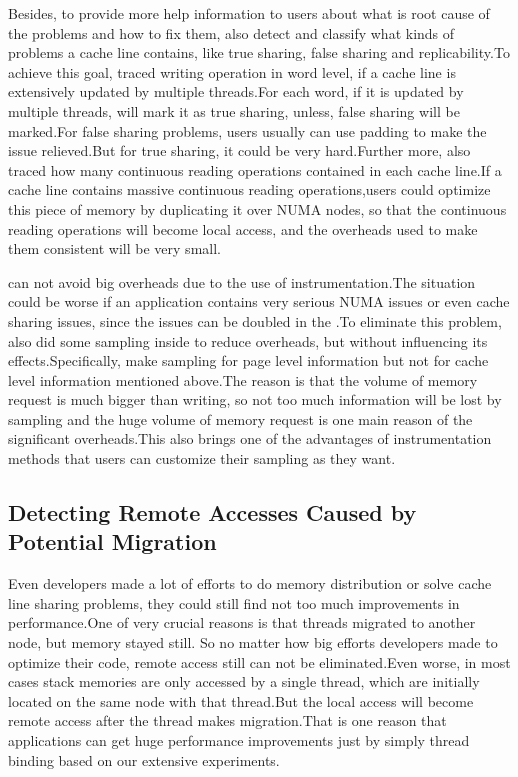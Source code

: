 Besides, to provide more help information to users about what is root cause of the problems and how to fix them, \NP{} also detect and classify what kinds of problems a cache line contains, like true sharing, false sharing and replicability.To achieve this goal, \NP{} traced writing operation in word level, if a cache line is extensively updated by multiple threads.For each word, if it is updated by multiple threads, \NP{} will mark it as true sharing, unless, false sharing will be marked.For false sharing problems, users usually can use padding to make the issue relieved.But for true sharing, it could be very hard.Further more, \NP{} also traced how many continuous reading operations contained in each cache line.If a cache line contains massive continuous reading operations,users could optimize this piece of memory by duplicating it over NUMA nodes, so that the continuous reading operations will become local access, and the overheads used to make them consistent will be very small.

\NP{} can not avoid big overheads due to the use of instrumentation.The situation could be worse if an application contains very serious NUMA issues or even cache sharing issues, since the issues can be doubled in the \NP{}.To eliminate this problem, \NP{} also did some sampling inside to reduce overheads, but without influencing its effects.Specifically, \NP{} make sampling for page level information but not for cache level information mentioned above.The reason is that the volume of memory request is much bigger than writing, so not too much information will be lost by sampling and the huge volume of memory request is one main reason of the significant overheads.This also brings one of the advantages of instrumentation methods that users can customize their sampling as they want.


\subsection{Detecting Remote Accesses Caused by Potential Migration} 
Even developers made a lot of efforts to do memory distribution or solve cache line sharing problems, they could still find not too much improvements in performance.One of very crucial reasons is that threads migrated to another node, but memory stayed still. So no matter how big efforts developers made to optimize their code, remote access still can not be eliminated.Even worse, in most cases stack memories are only accessed by a single thread, which are initially located on the same node with that thread.But the local access will become remote access after the thread makes migration.That is one reason that applications can get huge performance improvements just by simply thread binding based on our extensive experiments.

